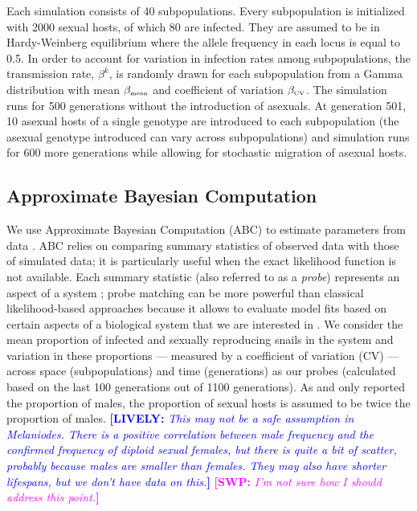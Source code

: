 \documentclass{article}\usepackage[]{graphicx}\usepackage[]{color}
\newcommand{\comment}[3]{\textcolor{#1}{\textbf{[#2: }\textit{#3}\textbf{]}}}
\newcommand{\swp}[1]{\comment{magenta}{SWP}{#1}}
\newcommand{\lively}[1]{\comment{blue}{LIVELY}{#1}}
\begin{document}
Each simulation consists of 40 subpopulations. 
Every subpopulation is initialized with 2000 sexual hosts, of which 80 are infected. 
They are assumed to be in Hardy-Weinberg equilibrium where the allele frequency in each locus is equal to 0.5. 
In order to account for variation in infection rates among subpopulations, the transmission rate, $\beta^k$, is randomly drawn for each subpopulation from a Gamma distribution with mean $\beta_{\textrm{\tiny mean}}$ and coefficient of variation $\beta_{\textrm{\tiny CV}}$. 
The simulation runs for 500 generations without the introduction of asexuals. At generation 501, 10 asexual hosts of a single genotype are introduced to each subpopulation (the asexual genotype introduced can vary across subpopulations) and simulation runs for 600 more generations while allowing for stochastic migration of asexual hosts.

\subsection{Approximate Bayesian Computation}

We use Approximate Bayesian Computation (ABC) to estimate parameters from data \citep{toni2009approximate}.
ABC relies on comparing summary statistics of observed data with those of simulated data; it is particularly useful when the exact likelihood function is not available.
Each summary statistic (also referred to as a \emph{probe}) represents an aspect of a system \citep{kendall1999populations};
probe matching can be more powerful than classical likelihood-based approaches because it allows to evaluate model fits based on certain aspects of a biological system that we are interested in \citep{wood2010statistical}.
We consider the mean proportion of infected and sexually reproducing snails in the system and variation in these proportions --- measured by a coefficient of variation (CV) --- across space (subpopulations) and time (generations) as our probes (calculated based on the last 100 generations out of 1100 generations).
As \cite{dagan2013clonal} and \cite{mckone2016fine} only reported the proportion of males, the proportion of sexual hosts is assumed to be twice the proportion of males.
\lively{This may not be a safe assumption in Melaniodes.  
There is a positive correlation between male frequency and the confirmed frequency of diploid sexual females, but there is quite a bit of scatter, probably because males are smaller than females.  They may also have shorter lifespans, but we don't have data on this.}
\swp{I'm not sure how I should address this point.}
\end{document}
